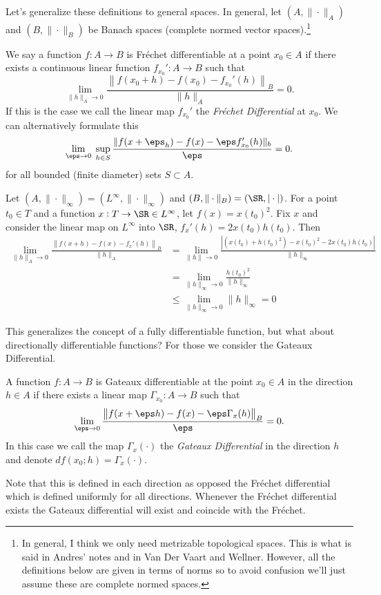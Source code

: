 Let's generalize these definitions to general spaces. In general, let \((A,\|\cdot\|_A)\) and \((B,\|\cdot\|_B)\) be Banach spaces (complete normed vector spaces).\footnote{In general, I think we only need metrizable topological spaces. This is what is said in Andres' notes and in Van Der Vaart and Wellner. However, all the definitions below are given in terms of norms so to avoid confusion we'll just assume these are complete normed spaces.} 

\begin{definition}
	\label{def:frechet-differentiable}
	We say a function \(f:A\to B\) is Fréchet differentiable at a point \(x_0\in A\) if there exists a continuous linear function \(f_{x_0}':A\to B\) such that
	\[
		\lim_{\|h\|_A\to 0} \frac{\left\|f(x_0+h)-f(x_0)-f_{x_0}'(h)\right\|_B}{\|h\|_A} = 0 
	.\] 
	If this is the case we call the linear map \(f_{x_0}'\) the \textit{Fréchet Differential} at \(x_0\). 
	We can alternatively formulate this
	\[
		\lim_{\eps\to 0}\;\sup_{h\in S} \frac{\|f(x+\eps_h)-f(x)-\eps f_{x_0}'(h)\|_b}{\eps} = 0 
	.\] 
	for all bounded (finite diameter) sets \(S \subset A\).
\end{definition}
\begin{example*}
	Let \((A,\|\cdot\|_{\infty}) = (L^\infty, \|\cdot\|_\infty)\) and \((B,\|\cdot\|_{B}) = (\SR,|\cdot|)\). For a point \(t_0 \in T\) and a function \(x:T\to\SR \in L^\infty\), let \(f(x) = x(t_0)^2\). Fix \(x\) and consider the linear map on \(L^\infty\) into \(\SR\), \(f_x'(h) = 2x(t_0)h(t_0)\). Then
	\begin{align*}
		\lim_{ \|h\|_A\to 0} \frac{\left\|f(x+h)-f(x)-f_x'(h)\right\|_B}{\|h\|_A} &= \lim_{\|h\|\to 0}\frac{\left|\left(x(t_0)+h(t_0)^2\right)-x(t_0)^2 - 2x(t_0)h(t_0)\right|}{\|h\|_\infty}  	\\ 
		&= \lim_{\|h\|_\infty \to 0}\frac{h(t_0)^2}{\|h\|_\infty} \\
		&\leq \lim_{\|h\|_\infty\to0}\|h\|_\infty = 0
	\end{align*}
\end{example*}

This generalizes the concept of a fully differentiable function, but what about directionally differentiable functions? For those we consider the Gateaux Differential. 
\begin{definition}
	\label{def:gateaux-differential}
	A function \(f:A\to B\) is Gateaux differentiable at the point \(x_0\in A\) in the direction \(h\in A\) if there exists a linear map \(\Gamma_{x_0}:A\to B\) such that 
	\[
		\lim_{\eps\to0} \frac{\left\|f(x+\eps h)-f(x) - \eps\Gamma_x(h)\right\|_B}{\eps} = 0 
	.\] 
	In this case we call the map \(\Gamma_x(\cdot)\) the \textit{Gateaux Differential} in the direction \(h\) and denote \(df(x_0;h)=\Gamma_x(\cdot)\).
\end{definition}
Note that this is defined in each direction as opposed the Fréchet differential which is defined uniformly for all directions. Whenever the Fréchet differential exists the Gateaux differential will exist and coincide with the Fréchet. 

